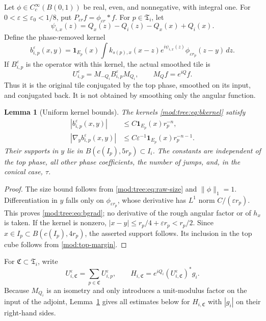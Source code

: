 \documentclass[11pt]{article}
\numberwithin{equation}{section}
\newtheorem{lemma}[theorem]{Lemma}
\theoremstyle{remark}
\theoremstyle{definition}
\newcommand{\norm}[1]{\lVert #1\rVert}
\newcommand{\TT}{\mathfrak T}
\begin{document}
Let $\phi\in C_c^\infty(B(0,1))$ be real, even, and nonnegative, with integral one. For $0<\varepsilon\le\varepsilon_0<1/8$, put $P_{\varepsilon r}f=\phi_{\varepsilon r}*f$. For $p\in\TT_i$, let
\[
 \psi_{i,x}(z)=Q_x(z)-Q_i(z)-Q_x(x)+Q_i(x).
\]
Define the phase-removed kernel
\begin{equation}\label{mod:tree:eq:bkernel}
 b_{i,p}^\varepsilon(x,y)
 =\mathbf1_{E_p}(x)\int k_{s(p),x}(x-z)e^{i\psi_{i,x}(z)}
 \phi_{\varepsilon r_p}(z-y)\,dz.
\end{equation}
If $B_{i,p}^\varepsilon$ is the operator with this kernel, the actual smoothed tile is
\[
 U_{i,p}^\varepsilon=M_{-Q_i}B_{i,p}^\varepsilon M_{Q_i},\qquad
 M_Qf=e^{iQ}f.
\]
Thus it is the original tile conjugated by the top phase, smoothed on its input, and conjugated back. It is not obtained by smoothing only the angular function.

\begin{lemma}[Uniform kernel bounds]\label{mod:tree:lem:kernel}
The kernels \eqref{mod:tree:eq:bkernel} satisfy
\begin{align}
 |b_{i,p}^\varepsilon(x,y)|&\le C\mathbf1_{E_p}(x)r_p^{-n},\label{mod:tree:eq:bsize}\\
 |\nabla_yb_{i,p}^\varepsilon(x,y)|&\le C\varepsilon^{-1}\mathbf1_{E_p}(x)r_p^{-n-1}.\label{mod:tree:eq:bgrad}
\end{align}
Their supports in $y$ lie in $B(c(I_p),5r_p)\subset I_i$. The constants are independent of the top phase, all other phase coefficients, the number of jumps, and, in the conical case, $\tau$.
\end{lemma}
\begin{proof}
The size bound follows from \eqref{mod:tree:eq:raw-size} and $\norm\phi_1=1$. Differentiation in $y$ falls only on $\phi_{\varepsilon r_p}$, whose derivative has $L^1$ norm $C/(\varepsilon r_p)$. This proves \eqref{mod:tree:eq:bgrad}; no derivative of the rough angular factor or of $h_x$ is taken. If the kernel is nonzero, $|x-y|\le r_p/4+\varepsilon r_p<r_p/2$. Since $x\in I_p\subset B(c(I_p),4r_p)$, the asserted support follows. Its inclusion in the top cube follows from \eqref{mod:top-margin}.
\end{proof}

For $\mathfrak C\subset\TT_i$, write
\[
 U_{i,\mathfrak C}^\varepsilon=\sum_{p\in\mathfrak C}U_{i,p}^\varepsilon,
 \qquad
 H_{i,\mathfrak C}=e^{iQ_i}(U_{i,\mathfrak C}^\varepsilon)^*g_i.
\]
Because $M_{Q_i}$ is an isometry and only introduces a unit-modulus factor on the input of the adjoint, Lemma~\ref{mod:tree:lem:kernel} gives all estimates below for $H_{i,\mathfrak C}$ with $|g_i|$ on their right-hand sides.
\end{document}
